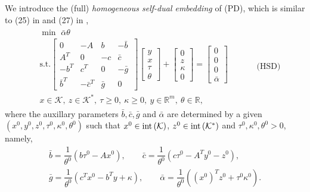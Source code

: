 \documentclass[11pt]{article}
\theoremstyle{definition}
\theoremstyle{plain}
\def\interior{\protect{\textnormal{int}}}
\begin{document}
We introduce the (full) \textit{homogeneous self-dual embedding} of (PD), which is similar to (25) in \cite{SDPT3_2010} and (27) in \cite{CVX},
\begin{align*}
\begin{split}
& \min \,\, \bar{\alpha}\theta \\
& \text{s.t.} \begin{bmatrix}
0 & -A & b & -\bar b\ \\ 
A^T & 0 & -c & \bar c \\
-b^T & c^T& 0 & -\bar g \\
\bar b^T & -\bar c^T & \bar g & 0
\end{bmatrix}
\begin{bmatrix}
y \\ x \\ \tau \\ \theta
\end{bmatrix} + 
\begin{bmatrix}
0 \\ z \\ \kappa \\ 0 
\end{bmatrix} = 
\begin{bmatrix}
0 \\ 0 \\ 0 \\ \bar \alpha
\end{bmatrix}\\
& x \in \mathcal{K},\ z \in \mathcal{K}^*,\ \tau \geq 0,\ \kappa\geq 0,\ y \in \mathbb{R}^m,\ \theta \in \mathbb{R}, 
\end{split} \quad \quad \quad \text{(HSD)}
\end{align*}
where the auxillary parameters $\bar b, \bar c, \bar g$ and $\bar \alpha$ are determined by a given $(x^0, y^0, z^0, \tau^0, \kappa^0, \theta^0)$ such that $x^0 \in \interior \left(\mathcal{K}\right)$, $z^0 \in \interior \left(\mathcal{K}^*\right)$ and $\tau^0, \kappa^0, \theta^0 > 0$, namely,
\begin{align*}
\bar b = \dfrac{1}{\theta^0}\left(b\tau^0 - Ax^0\right),\quad\quad  \bar c = \dfrac{1}{\theta^0}\left(c\tau^0 - A^Ty^0 - z^0\right), \\ 
\bar g = \dfrac{1}{\theta^0}\left(c^T x^0 - b^T y + \kappa\right), \quad\quad  \bar \alpha = \dfrac{1}{\theta^0}\left((x^0)^T z^0 + \tau^0\kappa^0\right).
\end{align*}
\end{document}
